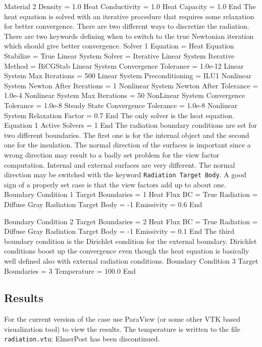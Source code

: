 Material 2
   Density = 1.0
   Heat Conductivity = 1.0
   Heat Capacity = 1.0
End
\ttend
The heat equation is solved with an iterative procedure that requires some relaxation 
for better convergence. There are two different ways to discretize the radiation. 
There are two keywords defining when to switch to the true Newtonian iteration
which should give better convergence.
\ttbegin
Solver 1
  Equation = Heat Equation
  Stabilize = True
  Linear System Solver = Iterative
  Linear System Iterative Method = BiCGStab
  Linear System Convergence Tolerance = 1.0e-12
  Linear System Max Iterations = 500
  Linear System Preconditioning = ILU1
  Nonlinear System Newton After Iterations = 1
  Nonlinear System Newton After Tolerance = 1.0e-4
  Nonlinear System Max Iterations = 50
  NonLinear System Convergence Tolerance = 1.0e-8
  Steady State Convergence Tolerance = 1.0e-8
  Nonlinear System Relaxation Factor = 0.7
End
\ttend
The only solver is the heat equation.
\ttbegin
Equation 1
  Active Solvers = 1
End
\ttend
%
The radiation boundary conditions are set for two different boundaries. The first one
is for the internal object and the second one for the insulation. The normal direction
of the surfaces is important since a wrong direction may result to a badly set problem for
the view factor computation. Internal and external surfaces are very different.
The normal direction may be switched with the keyword \texttt{Radiation Target Body}.
A good sign of a properly set case is that the view factors add up to about one.
\ttbegin
Boundary Condition 1
   Target Boundaries = 1
   Heat Flux BC = True
   Radiation = Diffuse Gray
   Radiation Target Body = -1
   Emissivity = 0.6
End

Boundary Condition 2
   Target Boundaries = 2
   Heat Flux BC = True
   Radiation = Diffuse Gray
   Radiation Target Body = -1
   Emissivity = 0.1
End
\ttend
%
The third boundary condition is the Dirichlet condition for the external boundary.
Dirichlet conditions boost up the convergence even though the heat equation is basically
well defined also with external radiation conditions.
\ttbegin
Boundary Condition 3
   Target Boundaries = 3
   Temperature = 100.0
End
\ttend


\subsection*{Results}

For the current version of the case use ParaView (or some other
VTK based visualization tool) to view the results. The temperature is
written to the file {\tt radiation.vtu}; ElmerPost has been discontinued.

